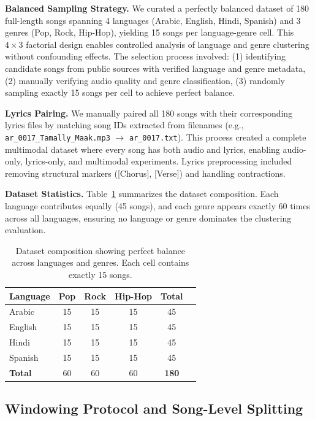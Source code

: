 \documentclass[10pt,twocolumn]{article}
\begin{document}
\textbf{Balanced Sampling Strategy.} We curated a perfectly balanced dataset of 180 full-length songs spanning 4 languages (Arabic, English, Hindi, Spanish) and 3 genres (Pop, Rock, Hip-Hop), yielding 15 songs per language-genre cell. This $4 \times 3$ factorial design enables controlled analysis of language and genre clustering without confounding effects. The selection process involved: (1) identifying candidate songs from public sources with verified language and genre metadata, (2) manually verifying audio quality and genre classification, (3) randomly sampling exactly 15 songs per cell to achieve perfect balance.

\textbf{Lyrics Pairing.} We manually paired all 180 songs with their corresponding lyrics files by matching song IDs extracted from filenames (e.g., \texttt{ar\_0017\_Tamally\_Maak.mp3} $\rightarrow$ \texttt{ar\_0017.txt}). This process created a complete multimodal dataset where every song has both audio and lyrics, enabling audio-only, lyrics-only, and multimodal experiments. Lyrics preprocessing included removing structural markers ([Chorus], [Verse]) and handling contractions.

\textbf{Dataset Statistics.} Table~\ref{tab:dataset_stats} summarizes the dataset composition. Each language contributes equally (45 songs), and each genre appears exactly 60 times across all languages, ensuring no language or genre dominates the clustering evaluation.

\begin{table}[t]
\centering
\caption{Dataset composition showing perfect balance across languages and genres. Each cell contains exactly 15 songs.}
\label{tab:dataset_stats}
\small
\begin{tabular}{lccccc}
\toprule
\textbf{Language} & \textbf{Pop} & \textbf{Rock} & \textbf{Hip-Hop} & \textbf{Total} \\
\midrule
Arabic  & 15 & 15 & 15 & 45 \\
English & 15 & 15 & 15 & 45 \\
Hindi   & 15 & 15 & 15 & 45 \\
Spanish & 15 & 15 & 15 & 45 \\
\midrule
\textbf{Total} & 60 & 60 & 60 & \textbf{180} \\
\bottomrule
\end{tabular}
\end{table}

\subsection{Windowing Protocol and Song-Level Splitting}
\end{document}

